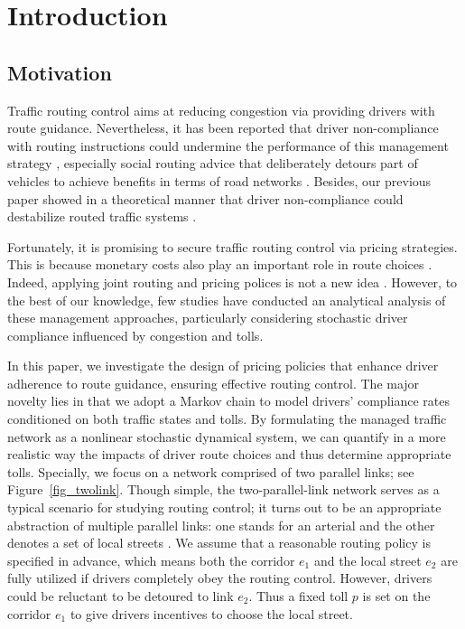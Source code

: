 \section{Introduction}

\subsection{Motivation}
Traffic routing control aims at reducing congestion via providing drivers with route guidance. Nevertheless, it has been reported that driver non-compliance with routing instructions could undermine the performance of this management strategy \cite{powell2000value}, especially social routing advice that deliberately detours part of vehicles to achieve benefits in terms of road networks \cite{van2019travelers}. Besides, our previous paper showed in a theoretical manner that driver non-compliance could destabilize routed traffic systems  \cite{tang2023does}. 

Fortunately, it is promising to secure traffic routing control via pricing strategies. This is because monetary costs also play an important role in route choices \cite{kerkman2012car}. Indeed, applying joint routing and pricing polices is not a new idea \cite{yang1999evaluating}. However, to the best of our knowledge, few studies have conducted an analytical analysis of these management approaches, particularly considering stochastic driver compliance influenced by congestion and tolls.   

In this paper, we investigate the design of pricing policies that enhance driver adherence to route guidance, ensuring effective routing control. The major novelty lies in that we adopt a Markov chain to model drivers' compliance rates  conditioned on both traffic states and tolls. By formulating the managed traffic network as a nonlinear stochastic dynamical system, we can quantify in a more realistic way the impacts of driver route choices and thus determine appropriate tolls. Specially, we focus on a network comprised of two parallel links; see Figure~\ref{fig_twolink}. Though simple, the two-parallel-link network serves as a typical scenario for studying routing control; it turns out to be an appropriate abstraction of multiple parallel links: one stands for an arterial and the other denotes a set of local streets \cite{pi2017stochastic}. We assume that a reasonable routing policy is specified in advance, which means both the corridor $e_1$ and the local street $e_2$ are fully utilized if drivers completely obey the routing control. However, drivers could be reluctant to be detoured to link $e_2$. Thus a fixed toll $p$ is set on the corridor $e_1$ to give drivers incentives to choose the local street.

